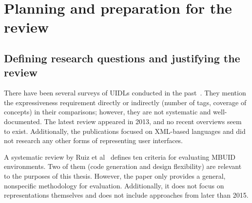 \section[Planning and preparation]{Planning and preparation for the review}\label{sec:planning-and-preparation-for-review}

\subsection{Defining research questions and justifying the review}\label{subsec:defining-research-questions-and-justifying-the-review}

There have been several surveys of UIDLs conducted in the past~\cite{Souchon2003, guerrero_garcia_theoretical_2009, guerrero_garcia_theoretical_2011, Jovanovic2013}.
They mention the expressiveness requirement directly or indirectly (number of tags, coverage of concepts) in their comparisons;
however, they are not systematic and well-documented.
The latest review appeared in 2013, and no recent overviews seem to exist.
Additionally, the publications focused on XML-based languages and did not research any other forms of representing user interfaces.

A systematic review by Ruiz et al~\cite{Ruiz2018} defines ten criteria for evaluating MBUID environments.
Two of them (code generation and design flexibility) are relevant to the purposes of this thesis.
However, the paper only provides a general, nonspecific methodology for evaluation.
Additionally, it does not focus on representations themselves and does not include approaches from later than 2015.


